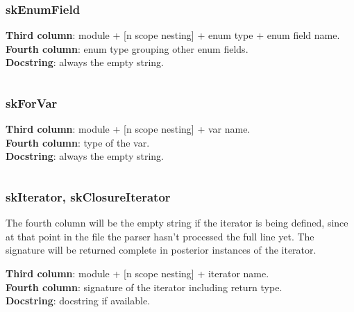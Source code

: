 \begin{verbatim}
\end{verbatim}

\hypertarget{skenumfield}{%
\subsubsection{skEnumField}\label{skenumfield}}

\textbf{Third column}: module + {[}n scope nesting{]} + enum type + enum
field name.\\
\textbf{Fourth column}: enum type grouping other enum fields.\\
\textbf{Docstring}: always the empty string.

\begin{verbatim}
\end{verbatim}

\hypertarget{skforvar}{%
\subsubsection{skForVar}\label{skforvar}}

\textbf{Third column}: module + {[}n scope nesting{]} + var name.\\
\textbf{Fourth column}: type of the var.\\
\textbf{Docstring}: always the empty string.

\begin{verbatim}
\end{verbatim}

\hypertarget{skiterator-skclosureiterator}{%
\subsubsection{skIterator,
skClosureIterator}\label{skiterator-skclosureiterator}}

The fourth column will be the empty string if the iterator is being
defined, since at that point in the file the parser hasn't processed the
full line yet. The signature will be returned complete in posterior
instances of the iterator.

\textbf{Third column}: module + {[}n scope nesting{]} + iterator name.\\
\textbf{Fourth column}: signature of the iterator including return
type.\\
\textbf{Docstring}: docstring if available.

\begin{verbatim}
\end{verbatim}

